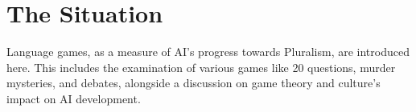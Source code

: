 \section{The Situation}
Language games, as a measure of AI's progress towards Pluralism, are introduced here. This includes the examination of various games like 20 questions, murder mysteries, and debates, alongside a discussion on game theory and culture's impact on AI development.
